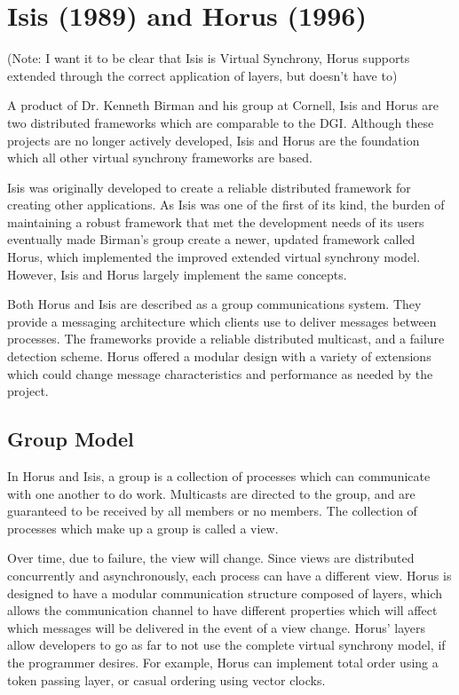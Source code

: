 \section{Isis (1989) and Horus (1996)}

(Note: I want it to be clear that Isis is Virtual Synchrony, Horus supports extended through the correct application of layers, but doesn't have to)

A product of Dr. Kenneth Birman and his group at Cornell, Isis and Horus are
two distributed frameworks which are comparable to the DGI. Although these
projects are no longer actively developed, Isis and Horus are the foundation
which all other virtual synchrony frameworks are based.

Isis was originally developed to create a reliable distributed framework for
creating other applications. As Isis was one of the first of its kind, the
burden of maintaining a robust framework that met the development needs of its
users eventually made Birman's group create a newer, updated framework called
Horus, which implemented the improved extended virtual synchrony model. However, 
Isis and Horus largely implement the same concepts.

Both Horus and Isis are described as a group communications system. They provide a 
messaging architecture which clients use to deliver messages between processes.
The frameworks provide a reliable distributed multicast, and a failure
detection scheme. Horus offered a modular design with a variety of extensions
which could change message characteristics and performance as needed by the 
project.

\subsection{Group Model}
In Horus and Isis, a group is a collection of processes which can communicate with one
another to do work. Multicasts are directed to the group, and are guaranteed to
be received by all members or no members. The collection of processes which
make up a group is called a view.

Over time, due to failure, the view will change. Since views are distributed
concurrently and asynchronously, each process can have a different view. Horus
is designed to have a modular communication structure composed of layers, which 
allows the communication channel to have different properties which will affect
which messages will be delivered in the event of a view change. Horus' layers
allow developers to go as far to not use the complete virtual synchrony model,
if the programmer desires. For example, Horus can implement total order using
a token passing layer, or casual ordering using vector clocks.

